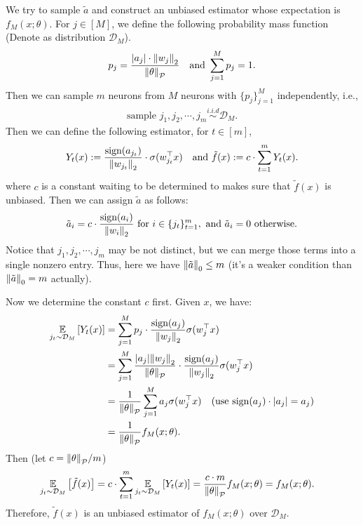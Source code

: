 \begin{answer}
    We try to sample $\tilde{a}$ and construct an unbiased estimator whose expectation is $f_M(x; \theta)$.
    For $j \in [M]$, we define the following probability mass function (Denote as distribution $\mathcal{D}_M$).
    \begin{align*}
        p_j = \frac{|a_j|\cdot\norm{w_j}_2}{\norm{\theta}_{\mathcal{P}}} \quad \text{and } \sum_{j=1}^M p_j = 1.
    \end{align*}
    Then we can sample $m$ neurons from $M$ neurons with $\{p_j\}_{j=1}^M$ independently, i.e., 
    \begin{align*}
        \text{sample } j_1, j_2, \cdots, j_m \overset{i.i.d}{\sim} \mathcal{D}_M.
    \end{align*}
    Then we can define the following estimator, for $ t\in [m]$,
    \begin{align*}
        Y_t(x) := \frac{\text{sign}(a_{j_t})}{\norm{w_{j_t}}_2} \cdot \sigma(w_{j_t}^{\top} x) \quad \text{and } \tilde{f}(x) := c\cdot \sum_{t=1}^m Y_t(x).
    \end{align*}
    where $c$ is a constant waiting to be determined to makes sure that $\tilde{f}(x)$ is unbiased. Then we can assign $\tilde{a}$ as follows:
    \begin{align*}
        \tilde{a}_{i} = c\cdot \frac{\text{sign}(a_{i})}{\norm{w_{i}}_2} \text{ for } i \in \{j_t\}_{t=1}^m, \text{ and } \tilde{a}_i = 0 \text{ otherwise.}
    \end{align*}
    Notice that $j_1, j_2, \cdots, j_m$ may be not distinct, but we can merge those terms into a single nonzero entry. Thus, here we have $\norm{\tilde{a}}_0 \le m$ (it's a weaker condition than $\norm{\tilde{a}}_0 = m$ actually).

    Now we determine the constant $c$ first. Given $x$, we have:
    \begin{align*}
        \operatorname*{\mathbb{E}}_{j_t \sim \mathcal{D}_M}\left[Y_t(x)\right] &= \sum_{j=1}^{M} p_j \cdot \frac{\text{sign}(a_{j})}{\norm{w_{j}}_2} \sigma(w_{j}^{\top} x) \\
        & = \sum_{j=1}^{M} \frac{|a_j| \norm{w_j}_2}{\norm{\theta}_{\mathcal{P}}} \cdot \frac{\text{sign}(a_{j})}{\norm{w_{j}}_2} \sigma(w_{j}^{\top} x) \\
        &= \frac{1}{\norm{\theta}_{\mathcal{P}}} \sum_{j=1}^{M} a_j \sigma(w_{j}^{\top} x) \quad (\text{use sign}(a_j)\cdot|a_j| = a_j) \\
        &= \frac{1}{\norm{\theta}_{\mathcal{P}}} f_M(x; \theta).
    \end{align*}
    Then (let  $c = \norm{\theta}_{\mathcal{P}} / m$)
    \begin{align*}
        \operatorname*{\mathbb{E}}_{j_t \sim \mathcal{D}_M}\left[\tilde{f}(x)\right] &= c\cdot \sum_{t=1}^m \operatorname*{\mathbb{E}}_{j_t \sim \mathcal{D}_M}\left[Y_t(x)\right] = \frac{c\cdot m}{\norm{\theta}_{\mathcal{P}}} f_M(x; \theta) = f_M(x; \theta).
    \end{align*}
    Therefore, $\tilde{f}(x)$ is an unbiased estimator of $f_M(x; \theta)$ over $\mathcal{D}_M$.


\end{answer}
